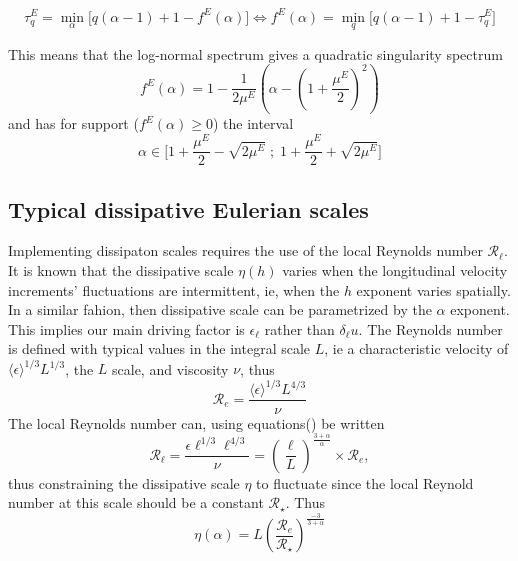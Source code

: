 \begin{equation}
    \tau_q^E=\min_\alpha\bigg[q(\alpha-1)+1-f^E(\alpha)\bigg]\iff f^E(\alpha)=\min_q\bigg[q(\alpha-1)+1-\tau_q^E\bigg]
\end{equation}

This means that the log-normal spectrum gives a quadratic singularity spectrum 
\begin{equation}
    f^E(\alpha)=1-\frac{1}{2\mu^E}\left(\alpha-\left(1+\frac{\mu^E}{2}\right)^2\right)
\end{equation}
and has for support ($f^E(\alpha)\geq0$) the interval $$ \alpha\in\bigg[1+\frac{\mu^E}{2}-\sqrt{2\mu^E}\;;\;1+\frac{\mu^E}{2}+\sqrt{2\mu^E}\bigg]$$

\subsection{Typical dissipative Eulerian scales}
Implementing dissipaton scales requires the use of the local Reynolds number $\mathcal{R}_\ell$. It is known that the dissipative scale $\eta(h)$ varies when the longitudinal velocity increments' fluctuations are intermittent, ie, when the $h$ exponent varies spatially.
In a similar fahion, then dissipative scale can be parametrized by the $\alpha$ exponent. This implies our main driving factor is $\epsilon_\ell$ rather than $\delta_\ell u$. The Reynolds number is defined with typical values in the integral scale $L$, ie a characteristic velocity of $\langle\epsilon\rangle^{1/3}L^{1/3}$, the $L$ scale, and viscosity $\nu$, thus
\begin{equation}
    \mathcal{R}_e=\frac{\langle\epsilon\rangle^{1/3}L^{4/3}}{\nu}
\end{equation}
The local Reynolds number can, using equations() be written
\begin{equation}
    \mathcal{R}_\ell=\frac{\epsilon\ell^{1/3}\ell^{4/3}}{\nu}=\left(\frac{\ell}{L}\right)^{\frac{3+\alpha}{\alpha}}\times\mathcal{R}_e,
\end{equation}
thus constraining the dissipative scale $\eta$ to fluctuate since the local Reynold number at this scale should be a constant $\mathcal{R}_\star$.
Thus
\begin{equation}
\eta(\alpha)=L\left(\frac{\mathcal{R}_e}{\mathcal{R}_\star}\right)^{\frac{-3}{3+\alpha}}
\end{equation}

